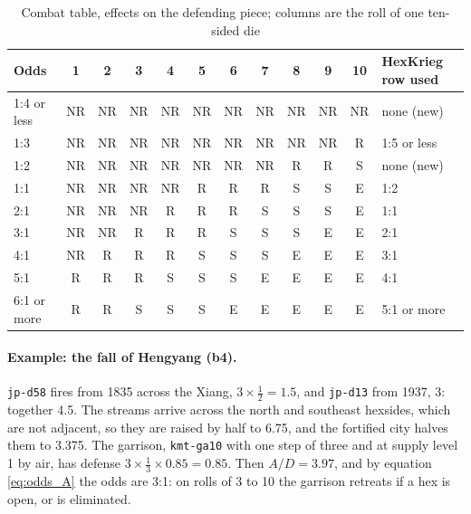 \documentclass[11pt]{article}
\begin{document}
\begin{table}[ht]
\centering\small
\begin{tabular}{@{}l*{10}{c}l@{}}
\toprule
Odds & 1 & 2 & 3 & 4 & 5 & 6 & 7 & 8 & 9 & 10 & HexKrieg row used \\
\midrule
1:4 or less & NR & NR & NR & NR & NR & NR & NR & NR & NR & NR & none (new) \\
1:3 & NR & NR & NR & NR & NR & NR & NR & NR & NR & R & 1:5 or less \\
1:2 & NR & NR & NR & NR & NR & NR & NR & R & R & S & none (new) \\
1:1 & NR & NR & NR & NR & R & R & R & S & S & E & 1:2 \\
2:1 & NR & NR & NR & R & R & R & S & S & S & E & 1:1 \\
3:1 & NR & NR & R & R & R & S & S & S & E & E & 2:1 \\
4:1 & NR & R & R & R & S & S & S & E & E & E & 3:1 \\
5:1 & R & R & R & S & S & S & E & E & E & E & 4:1 \\
6:1 or more & R & R & S & S & S & E & E & E & E & E & 5:1 or more \\
\bottomrule
\end{tabular}
\caption{Combat table, effects on the defending piece; columns are the roll of one ten-sided die}\label{tab:crt}
\end{table}

\paragraph{Example: the fall of Hengyang (b4).} \texttt{jp-d58} fires from 1835 across the Xiang, $3\times\tfrac{1}{2}=1.5$, and \texttt{jp-d13} from 1937, 3: together 4.5. The streams arrive across the north and southeast hexsides, which are not adjacent, so they are raised by half to 6.75, and the fortified city halves them to 3.375. The garrison, \texttt{kmt-ga10} with one step of three and at supply level 1 by air, has defense $3\times\tfrac{1}{3}\times 0.85=0.85$. Then $A/D=3.97$, and by equation \eqref{eq:odds_A} the odds are 3:1: on rolls of 3 to 10 the garrison retreats if a hex is open, or is eliminated.
\end{document}
